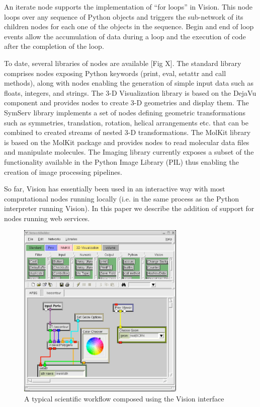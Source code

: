 \documentclass[conference]{IEEEtran}
\begin{document}
An iterate node supports the implementation of “for loops” in Vision. This
node loops over any sequence of Python objects and triggers the sub-network
of its children nodes for each one of the objects in the sequence. Begin
and end of loop events allow the accumulation of data during a loop and the
execution of code after the completion of the loop. 

To date, several libraries of nodes are available [Fig X]. The standard
library comprises nodes exposing Python keywords (print, eval, setattr and
call methods), along with nodes enabling the generation of simple input
data such as floats, integers, and strings. The 3-D Visualization library
is based on the DejaVu component and provides nodes to create 3-D
geometries and display them. The SymServ library implements a set of nodes
defining geometric transformations such as symmetries, translation,
rotation, helical arrangements etc. that can be combined to created streams
of nested 3-D transformations. The MolKit library is based on the MolKit
package and provides nodes to read molecular data files and manipulate
molecules. The Imaging library currently exposes a subset of the
functionality available in the Python Image Library (PIL) thus enabling the
creation of image processing pipelines.

So far, Vision has essentially been used in an interactive way with most
computational nodes running locally (i.e. in the same process as the Python
interpreter running Vision). In this paper we describe the addition of
support for nodes running web services. 

\begin{figure}
\begin{center}
\includegraphics[width=8cm]{vision-overview}
\end{center}
\caption{A typical scientific workflow composed using the Vision interface}
\label{fig:vision-overview}
\end{figure}
\end{document}

